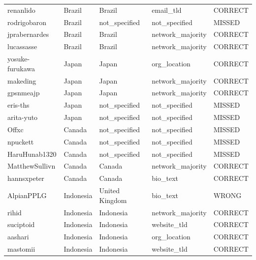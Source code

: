 \documentclass[11pt,a4paper]{article}
\begin{document}
\begin{longtable}{>{\ttfamily\small}p{4.4cm} p{3.0cm} p{3.0cm} p{2.6cm} p{1.6cm}}
\rowcolor{correct}  renanlido                 & Brazil         & Brazil          & email\_tld       & CORRECT \\
\rowcolor{missed}   rodrigobaron              & Brazil         & not\_specified  & not\_specified   & MISSED  \\
\rowcolor{correct}  jprabernardes             & Brazil         & Brazil          & network\_majority & CORRECT \\
\rowcolor{correct}  lucassasse                & Brazil         & Brazil          & network\_majority & CORRECT \\
\rowcolor{correct}  yosuke-furukawa           & Japan          & Japan           & org\_location    & CORRECT \\
\rowcolor{correct}  makeding                  & Japan          & Japan           & network\_majority & CORRECT \\
\rowcolor{correct}  gpsnmeajp                 & Japan          & Japan           & network\_majority & CORRECT \\
\rowcolor{missed}   eris-ths                  & Japan          & not\_specified  & not\_specified   & MISSED  \\
\rowcolor{missed}   arita-yuto                & Japan          & not\_specified  & not\_specified   & MISSED  \\
\rowcolor{missed}   Offxc                     & Canada         & not\_specified  & not\_specified   & MISSED  \\
\rowcolor{missed}   npuckett                  & Canada         & not\_specified  & not\_specified   & MISSED  \\
\rowcolor{missed}   HaruHunab1320             & Canada         & not\_specified  & not\_specified   & MISSED  \\
\rowcolor{correct}  MatthewSullivn            & Canada         & Canada          & network\_majority & CORRECT \\
\rowcolor{correct}  hannsxpeter               & Canada         & Canada          & bio\_text        & CORRECT \\
\rowcolor{wrong}    AlpianPPLG                & Indonesia      & United Kingdom  & bio\_text        & WRONG   \\
\rowcolor{correct}  rihid                     & Indonesia      & Indonesia       & network\_majority & CORRECT \\
\rowcolor{correct}  suciptoid                 & Indonesia      & Indonesia       & website\_tld     & CORRECT \\
\rowcolor{correct}  aashari                   & Indonesia      & Indonesia       & org\_location    & CORRECT \\
\rowcolor{correct}  mastomii                  & Indonesia      & Indonesia       & website\_tld     & CORRECT \\

\end{longtable}
\end{document}
